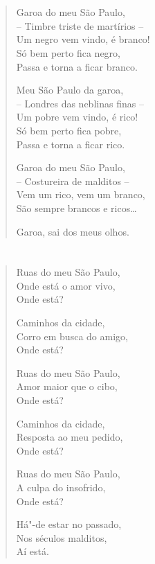 \chapter*{}

\begin{verse}
Garoa do meu São Paulo,\\
-- Timbre triste de martírios --\\
Um negro vem vindo, é branco!\\
Só bem perto fica negro,\\
Passa e torna a ficar branco.

Meu São Paulo da garoa,\\
-- Londres das neblinas finas --\\
Um pobre vem vindo, é rico!\\
Só bem perto fica pobre,\\
Passa e torna a ficar rico.

Garoa do meu São Paulo,\\
-- Costureira de malditos --\\
Vem um rico, vem um branco,\\
São sempre brancos e ricos\ldots{}

Garoa, sai dos meus olhos.
\end{verse}

\chapter*{}

\begin{verse}
Ruas do meu São Paulo,\\
Onde está o amor vivo,\\
Onde está?

Caminhos da cidade,\\
Corro em busca do amigo,\\
Onde está?

Ruas do meu São Paulo,\\
Amor maior que o cibo,\\
Onde está?

Caminhos da cidade,\\
Resposta ao meu pedido,\\
Onde está?

Ruas do meu São Paulo,\\
A culpa do insofrido,\\
Onde está?

Há"-de estar no passado,\\
Nos séculos malditos,\\
Aí está.
\end{verse}

